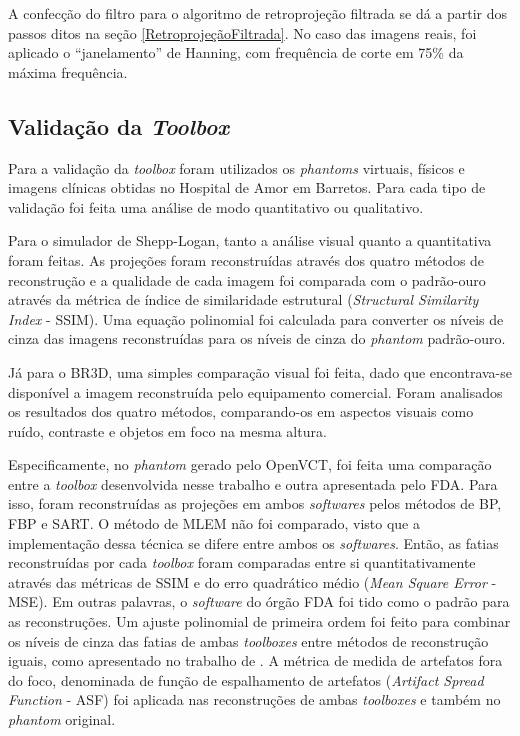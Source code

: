 A confecção do filtro para o algoritmo de retroprojeção filtrada se dá a partir dos passos ditos na seção \ref{RetroprojeçãoFiltrada}. No caso das imagens reais, foi aplicado o ``janelamento'' de Hanning, com frequência de corte em 75\% da máxima frequência.

\subsection{Validação da \textit{Toolbox}} 

Para a validação da \textit{toolbox} foram utilizados os \textit{phantoms} virtuais, físicos e imagens clínicas obtidas no Hospital de Amor em Barretos. Para cada tipo de validação foi feita uma análise de modo quantitativo ou qualitativo.

Para o simulador de Shepp-Logan, tanto a análise visual quanto a quantitativa foram feitas. As projeções foram reconstruídas através dos quatro métodos de reconstrução e a qualidade de cada imagem foi comparada com o padrão-ouro através da métrica de índice de similaridade estrutural (\textit{Structural Similarity Index} - \acs{SSIM}). Uma equação polinomial foi calculada para converter os níveis de cinza das imagens reconstruídas para os níveis de cinza do \textit{phantom} padrão-ouro.

Já para o BR3D, uma simples comparação visual foi feita, dado que encontrava-se disponível a imagem reconstruída pelo equipamento comercial. Foram analisados os resultados dos quatro métodos, comparando-os em aspectos visuais como ruído, contraste e objetos em foco na mesma altura. 

Especificamente, no \textit{phantom} gerado pelo OpenVCT, foi feita uma comparação entre a \textit{toolbox} desenvolvida nesse trabalho e outra apresentada pelo \acs{FDA}. Para isso, foram reconstruídas as projeções em ambos \textit{softwares} pelos métodos de \acs{BP}, \acs{FBP} e \acs{SART}. O método de \acs{MLEM} não foi comparado, visto que a implementação dessa técnica se difere entre ambos os \textit{softwares}. Então, as fatias reconstruídas por cada \textit{toolbox} foram comparadas entre si quantitativamente através das métricas de \acs{SSIM} e do erro quadrático médio (\textit{Mean Square Error} - \acs{MSE}). Em outras palavras, o \textit{software} do órgão \acs{FDA} foi tido como o padrão para as reconstruções.  Um ajuste polinomial de primeira ordem foi feito para combinar os níveis de cinza das fatias de ambas \textit{toolboxes} entre métodos de reconstrução iguais, como apresentado no trabalho de . A métrica de medida de artefatos fora do foco, denominada de função de espalhamento de artefatos (\textit{Artifact Spread Function} - \acs{ASF}) foi aplicada nas reconstruções de ambas \textit{toolboxes} e também no \textit{phantom} original.

